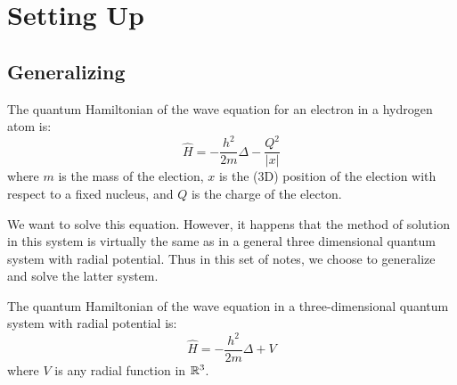 \section{Setting Up}

\subsection{Generalizing}
The quantum Hamiltonian of the wave equation for an electron in a hydrogen atom is:
\[
    \hat{H} = - \frac{h^2}{2m}\Delta - \frac{Q^2}{|x|}
\]
where $m$ is the mass of the election, $x$ is the (3D) position of the election with respect to a fixed nucleus, and $Q$ is the charge of the electon.

We want to solve this equation. However, it happens that the method of solution in this system is virtually the same as in a general three dimensional quantum system with radial potential. Thus in this set of notes, we choose to generalize and solve the latter system.

The quantum Hamiltonian of the wave equation in a three-dimensional quantum system with radial potential is:
\[
    \hat{H} = - \frac{h^2}{2m}\Delta + V
\]
where $V$ is any radial function in ${\mathbb R}^3$.

\subsection{}
